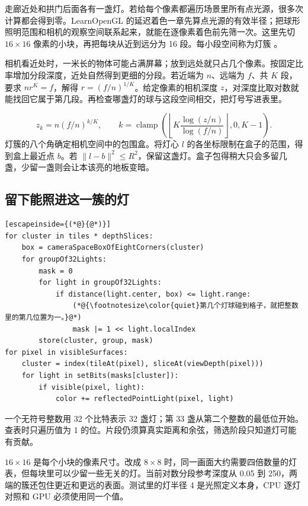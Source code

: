 走廊近处和拱门后面各有一盏灯。若给每个像素都遍历场景里所有点光源，很多次计算都会得到零。LearnOpenGL 的延迟着色一章先算点光源的有效半径；把球形照明范围和相机的观察空间联系起来，就能在逐像素着色前先筛一次。这里先切 $16\times16$ 像素的小块，再把每块从近到远分为 16 段。每小段空间称为灯簇 。

相机看近处时，一米长的物体可能占满屏幕；放到远处就只占几个像素。按固定比率增加分段深度，近处自然得到更细的分段。若近端为 $n$、远端为 $f$、共 $K$ 段，要求 $n r^K=f$，解得 $r=(f/n)^{1/K}$。给定像素的相机深度 $z$，对深度比取对数就能找回它属于第几段。再检查哪盏灯的球与这段空间相交，把灯号写进表里。

\[
 z_k=n(f/n)^{k/K},\qquad
 k=\operatorname{clamp}\!\left(\left\lfloor K\frac{\log(z/n)}{\log(f/n)}\right\rfloor,0,K-1\right).
\]
灯簇的八个角确定相机空间中的包围盒。将灯心 $l$ 的各坐标限制在盒子的范围，得到盒上最近点 $b$。若 $\|l-b\|^2\le R^2$，保留这盏灯。盒子包得稍大只会多留几盏，少留一盏则会让本该亮的地板变暗。
\clearpage
\subsection{留下能照进这一簇的灯}
\par\nopagebreak
\begin{lstlisting}[escapeinside={(*@}{@*)}]
for cluster in tiles * depthSlices:
    box = cameraSpaceBoxOfEightCorners(cluster)
    for groupOf32Lights:
        mask = 0
        for light in groupOf32Lights:
            if distance(light.center, box) <= light.range:
                (*@{\footnotesize\color{quiet}第几个灯球碰到格子，就把整数里的第几位置为一。}@*)
                mask |= 1 << light.localIndex
        store(cluster, group, mask)
for pixel in visibleSurfaces:
    cluster = index(tileAt(pixel), sliceAt(viewDepth(pixel)))
    for light in setBits(masks[cluster]):
        if visible(pixel, light):
            color += reflectedPointLight(pixel, light)
\end{lstlisting}
一个无符号整数用 32 个比特表示 32 盏灯；第 33 盏从第二个整数的最低位开始。查表时只遍历值为 1 的位。片段仍须算真实距离和余弦，筛选阶段只知道灯可能有贡献。

$16\times16$ 是每个小块的像素尺寸。改成 $8\times8$ 时，同一画面大约需要四倍数量的灯表，但每块里可以少留一些无关的灯。当前对数分段参考深度从 0.05 到 250，两端的簇还包住更近和更远的表面。测试里的灯半径 4 是光照定义本身，CPU 逐灯对照和 GPU 必须使用同一个值。

